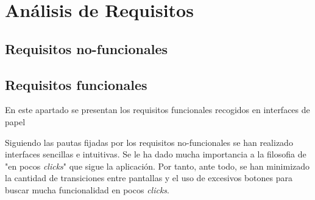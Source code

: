 
\chapter{Análisis de Requisitos}
\label{analisis-de-requisitos}

\section{Requisitos no-funcionales}
\label{analisis-de-requisitos:no-funcionales}

\section{Requisitos funcionales}
\label{analisis-de-requisitos:funcionales}

En este apartado se presentan los requisitos funcionales recogidos en interfaces de papel

Siguiendo las pautas fijadas por los requisitos no-funcionales se han realizado interfaces sencillas e intuitivas. Se le ha dado mucha importancia a la filosofia de "en pocos \textit{clicks}" que sigue la aplicación. Por tanto, ante todo, se han minimizado la cantidad de transiciones entre pantallas y el uso de excesivos botones para buscar mucha funcionalidad en pocos \textit{clicks}.\\

